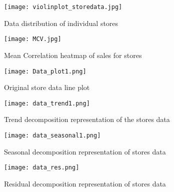 
\begin{figure*}[!h]
 \centering
 \texttt{[image: violinplot\_storedata.jpg]}
 \label{Fig2Boxplot}
 \caption{Data distribution of individual stores}
\end{figure*}


\begin{figure*}[!h]
 \centering
 \texttt{[image: MCV.jpg]}
 \label{Fig3Corr}
 \caption{Mean Correlation heatmap of sales for stores }
\end{figure*}


\begin{figure*}[!h]
 \centering
 \texttt{[image: Data\_plot1.png]}
 \label{Fig4StoreDataPlots}
 \caption{Original store data line plot}
\end{figure*}


\begin{figure*}[!h]
 \centering
 \texttt{[image: data\_trend1.png]}
 \label{Fig5Trend}
 \caption{Trend decomposition representation of the stores data}
\end{figure*}


\begin{figure*}[!h]
 \centering
 \texttt{[image: data\_seasonal1.png]}
 \label{Fig6Seasonality}
 \caption{Seasonal decomposition representation of stores data}
\end{figure*}


\begin{figure*}[!h]
 \centering
 \texttt{[image: data\_res.png]}
 \label{Fig7Residual}
 \caption{Residual decomposition representation of stores data}
\end{figure*}

